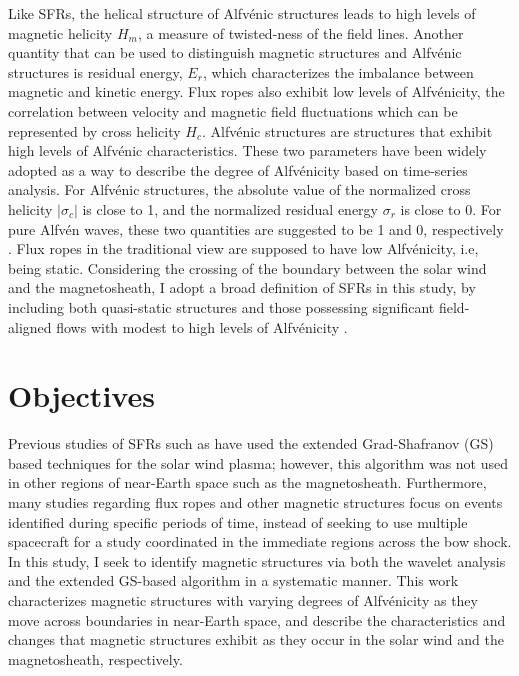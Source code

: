 Like SFRs, the helical structure of Alfv\'enic structures leads to high levels of magnetic helicity $H_m$\footnotemark{}, a measure of twisted-ness of the field lines. Another quantity that can be used to distinguish magnetic structures and Alfv\'enic structures is residual energy, $E_r$\footnotemark[\value{footnote}], which characterizes the imbalance between magnetic and kinetic energy. Flux ropes also exhibit low levels of Alfv\'enicity, the correlation between velocity and magnetic field fluctuations which can be represented by cross helicity $H_c$\footnotemark[\value{footnote}]. Alfv\'enic structures are structures that exhibit high levels of Alfv\'enic characteristics. These two parameters have been widely adopted as a way to describe the degree of Alfv\'enicity based on time-series analysis. For Alfv\'enic structures, the absolute value of the normalized cross helicity $|\sigma_c|$ is close to 1, and the normalized residual energy $\sigma_r$ is close to 0. For pure Alfv\'en waves, these two quantities are suggested to be 1 and 0, respectively \citep{Bruno:2013}. Flux ropes in the traditional view are supposed to have low Alfv\'enicity, i.e, being static. Considering the crossing of the boundary between the solar wind and the magnetosheath, I adopt a broad definition of SFRs in this study, by including both quasi-static structures and those possessing significant field-aligned flows with modest to high levels of Alfv\'enicity \citep{Chen:2022}.



\section{Objectives}
Previous studies of SFRs such as \cite{Chen:2022} have used the extended Grad-Shafranov (GS) based techniques for the solar wind plasma; however, this algorithm was not used in other regions of near-Earth space such as the magnetosheath. Furthermore, many studies regarding flux ropes and other magnetic structures \citep{Zhao:2020, Chen:2021} focus on events identified during specific periods of time, instead of seeking to use multiple spacecraft for a study coordinated in the immediate regions across the bow shock. In this study, I seek to identify magnetic structures via both the wavelet analysis and the extended GS-based algorithm in a systematic manner. This work characterizes magnetic structures with varying degrees of Alfv\'enicity as they move across boundaries in near-Earth space, and describe the characteristics and changes that magnetic structures exhibit as they occur in the solar wind and the magnetosheath, respectively.  

